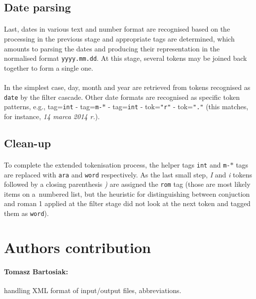 \documentclass[oneside,12pt]{article}
\begin{document}
\subsection{Date parsing}

\paragraph{}
Last, dates in various text and number format are recognised based on the processing in the previous stage and appropriate tags are determined, which amounts to parsing the dates and producing their representation in the normalised format \texttt{yyyy.mm.dd}. At this stage, several tokens may be joined back together to form a single one.

\paragraph{}
In the simplest case, day, month and year are retrieved from tokens recognised as \texttt{date} by the filter cascade. Other date formats are recognised as specific token patterns, e.g., tag=\texttt{int} - tag=\texttt{m-$\ast$} - tag=\texttt{int} - tok=\texttt{"r"} - tok=\texttt{"."} (this matches, for instance, \textit{14 marca 2014 r.}).

\subsection{Clean-up}

\paragraph{}
To complete the extended tokenisation process, the helper tags \texttt{int} and \texttt{m-$\ast$} tags are replaced with \texttt{ara} and \texttt{word} respectively. As the last small step, \textit{I} and \textit{i} tokens followed by a closing parenthesis \textit{)} are assigned the \texttt{rom} tag (those are most likely items on a~numbered list, but the heuristic for distinguishing between conjuction and roman 1 applied at the filter stage did not look at the next token and tagged them as \texttt{word}).

\section{Authors contribution}

\paragraph{Tomasz Bartosiak:} handling XML format of input/output files, abbreviations.
\end{document}

